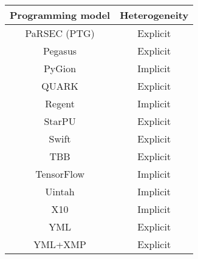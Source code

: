 \begin{tabular}{cc}
\hline
Programming model & Heterogeneity \\
\hline
PaRSEC (PTG) & Explicit\\
Pegasus & Explicit\\
PyGion & Implicit\\
QUARK & Explicit\\
Regent & Implicit\\
StarPU & Explicit\\
Swift & Explicit\\
TBB & Explicit\\
TensorFlow & Implicit\\
Uintah & Implicit\\
X10 & Implicit\\
YML & Explicit\\
YML+XMP & Explicit\\
\hline
\end{tabular}
